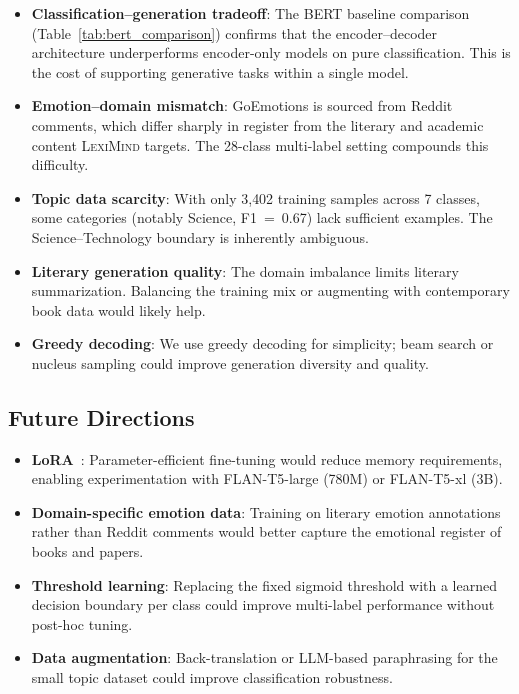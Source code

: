 \documentclass[11pt,a4paper]{article}
\newcommand{\lexiname}{\textsc{LexiMind}}
\begin{document}
\begin{itemize}[nosep]
    \item \textbf{Classification--generation tradeoff}: The BERT baseline comparison (Table~\ref{tab:bert_comparison}) confirms that the encoder--decoder architecture underperforms encoder-only models on pure classification. This is the cost of supporting generative tasks within a single model.
    \item \textbf{Emotion--domain mismatch}: GoEmotions is sourced from Reddit comments, which differ sharply in register from the literary and academic content \lexiname{} targets. The 28-class multi-label setting compounds this difficulty.
    \item \textbf{Topic data scarcity}: With only 3{,}402 training samples across 7 classes, some categories (notably Science, F1~=~0.67) lack sufficient examples. The Science--Technology boundary is inherently ambiguous.
    \item \textbf{Literary generation quality}: The domain imbalance limits literary summarization. Balancing the training mix or augmenting with contemporary book data would likely help.
    \item \textbf{Greedy decoding}: We use greedy decoding for simplicity; beam search or nucleus sampling could improve generation diversity and quality.
\end{itemize}

\subsection{Future Directions}

\begin{itemize}[nosep]
    \item \textbf{LoRA}~\citep{hu2022lora}: Parameter-efficient fine-tuning would reduce memory requirements, enabling experimentation with FLAN-T5-large (780M) or FLAN-T5-xl (3B).
    \item \textbf{Domain-specific emotion data}: Training on literary emotion annotations rather than Reddit comments would better capture the emotional register of books and papers.
    \item \textbf{Threshold learning}: Replacing the fixed sigmoid threshold with a learned decision boundary per class could improve multi-label performance without post-hoc tuning.
    \item \textbf{Data augmentation}: Back-translation or LLM-based paraphrasing for the small topic dataset could improve classification robustness.
\end{itemize}
\end{document}
